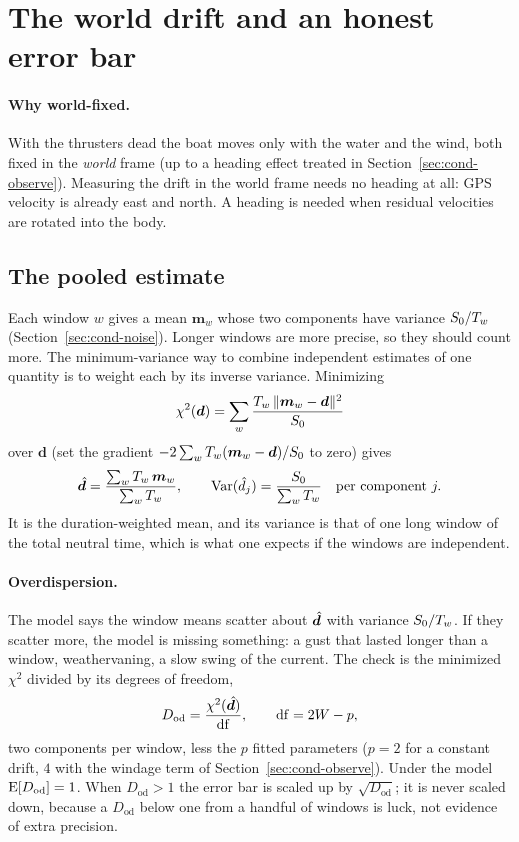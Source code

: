 \section{The world drift and an honest error bar}
\label{sec:cond-drift}

\paragraph{Why world-fixed.} With the thrusters dead the boat moves only with the
water and the wind, both fixed in the \emph{world} frame (up to a heading effect
treated in Section~\ref{sec:cond-observe}). Measuring the drift in the world
frame needs no heading at all: GPS velocity is already east and north. A heading
is needed when residual velocities are rotated into the body.

\subsection{The pooled estimate}

Each window $w$ gives a mean $\bm m_w$ whose two components have variance
$S_0/T_w$ (Section~\ref{sec:cond-noise}). Longer windows are more precise, so
they should count more. The minimum-variance way to combine independent
estimates of one quantity is to weight each by its inverse variance. Minimizing
\[
  \chi^2(\bm d) = \sum_w \frac{T_w\,\|\bm m_w - \bm d\|^2}{S_0}
\]
over $\bm d$ (set the gradient $-2\sum_w T_w(\bm m_w - \bm d)/S_0$ to zero) gives
\[
  \hat{\bm d} = \frac{\sum_w T_w\,\bm m_w}{\sum_w T_w},\qquad
  \operatorname{Var}(\hat d_j) = \frac{S_0}{\sum_w T_w}\quad\text{per component } j.
\]
It is the duration-weighted mean, and its variance is that of one long window of
the total neutral time, which is what one expects if the windows are independent.

\paragraph{Overdispersion.} The model says the window means scatter about
$\hat{\bm d}$ with variance $S_0/T_w$. If they scatter more, the model is missing
something: a gust that lasted longer than a window, weathervaning, a slow swing
of the current. The check is the minimized $\chi^2$ divided by its degrees of
freedom,
\[
  D_{\mathrm{od}} = \frac{\chi^2(\hat{\bm d})}{\mathrm{df}},\qquad \mathrm{df} = 2W - p,
\]
two components per window, less the $p$ fitted parameters ($p = 2$ for a constant
drift, $4$ with the windage term of Section~\ref{sec:cond-observe}). Under the model
$\operatorname{E}[D_{\mathrm{od}}] = 1$. When $D_{\mathrm{od}} > 1$ the error bar is scaled up by $\sqrt{D_{\mathrm{od}}}$; it is never
scaled down, because a $D_{\mathrm{od}}$ below one from a handful of windows is luck, not
evidence of extra precision.

